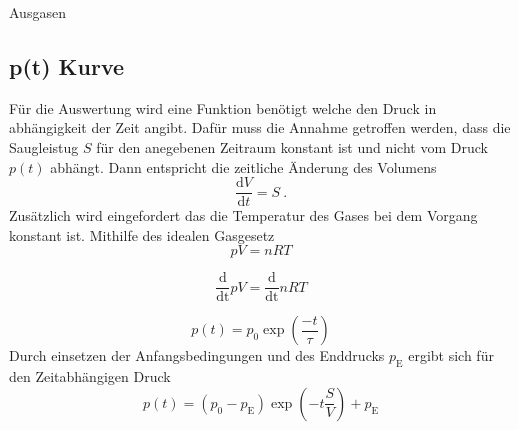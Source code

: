 Ausgasen


\subsection{p(t) Kurve}
Für die Auswertung wird eine Funktion benötigt welche den Druck in abhängigkeit der Zeit angibt. Dafür muss die Annahme getroffen werden, dass die Saugleistug $S$ für den anegebenen Zeitraum konstant ist und nicht vom Druck $p(t)$ abhängt. Dann entspricht die zeitliche Änderung des Volumens 
\begin{equation}
  \frac{\text{d}V}{\text{d}t} = S \ .
\end{equation}
Zusätzlich wird eingefordert das die Temperatur des Gases bei dem Vorgang konstant ist. Mithilfe des idealen Gasgesetz
\begin{equation}
  p V = n R T
\end{equation}

\begin{equation}
  \frac{\text{d}}{\text{dt}} pV = \frac{\text{d}}{\text{dt}} n R T
\end{equation}

\begin{equation}
  p(t) = p_0 \exp \left( \frac{-t}{\tau} \right)
\end{equation}
Durch einsetzen der Anfangsbedingungen und des Enddrucks $p_\text{E}$ ergibt sich für den Zeitabhängigen Druck 
\begin{equation}
  p(t) = (p_0 - p_\text{E}) \exp \left( -t \frac{S}{V} \right) + p_\text{E}
\end{equation}

